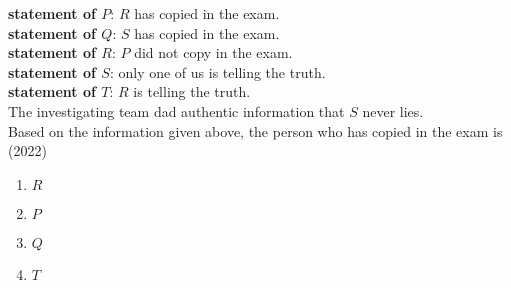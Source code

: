     \textbf{statement of $P$}: $R$ has copied in the exam.\\
    \textbf{statement of $Q$}: $S$ has copied in the exam.\\
    \textbf{statement of $R$}: $P$ did not copy in the exam.\\
    \textbf{statement of $S$}: only one of us is telling the truth.\\
    \textbf{statement of $T$}: $R$ is telling the truth.\\
    The investigating team dad authentic information that $S$ never lies.\\
    Based on the information given above, the person who has copied in the exam is 
    \hfill{(2022)}
    \begin{enumerate}
        \item $R$
        \item $P$
        \item $Q$
        \item $T$
    \end{enumerate}
         
